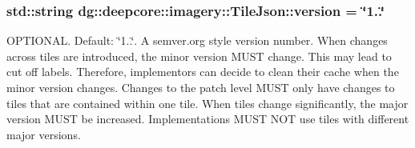 \subsubsection[{\texorpdfstring{version}{version}}]{\setlength{\rightskip}{0pt plus 5cm}std\+::string dg\+::deepcore\+::imagery\+::\+Tile\+Json\+::version = \char`\"{}1..\char`\"{}}\hypertarget{structdg_1_1deepcore_1_1imagery_1_1_tile_json_a3037558f224105b744a9a2c43fdb7b5e}{}\label{structdg_1_1deepcore_1_1imagery_1_1_tile_json_a3037558f224105b744a9a2c43fdb7b5e}
O\+P\+T\+I\+O\+N\+AL. Default\+: \char`\"{}1..\char`\"{}. A semver.\+org style version number. When changes across tiles are introduced, the minor version M\+U\+ST change. This may lead to cut off labels. Therefore, implementors can decide to clean their cache when the minor version changes. Changes to the patch level M\+U\+ST only have changes to tiles that are contained within one tile. When tiles change significantly, the major version M\+U\+ST be increased. Implementations M\+U\+ST N\+OT use tiles with different major versions. 